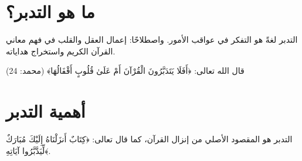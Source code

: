 
\section{ما هو التدبر؟}

التدبر لغةً هو التفكر في عواقب الأمور. واصطلاحًا: إعمال العقل والقلب في فهم معاني القرآن الكريم واستخراج هداياته.

\begin{tadaburbox}
قال الله تعالى: ﴿أَفَلَا يَتَدَبَّرُونَ الْقُرْآنَ أَمْ عَلَىٰ قُلُوبٍ أَقْفَالُهَا﴾ (محمد: 24)
\end{tadaburbox}

\section{أهمية التدبر}

التدبر هو المقصود الأصلي من إنزال القرآن، كما قال تعالى: ﴿كِتَابٌ أَنزَلْنَاهُ إِلَيْكَ مُبَارَكٌ لِّيَدَّبَّرُوا آيَاتِهِ﴾.
